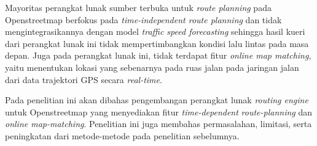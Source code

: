 Mayoritas perangkat lunak sumber terbuka untuk \textit{route planning} pada Openstreetmap berfokus pada \textit{time-independent route planning} dan tidak mengintegrasikannya dengan model \textit{traffic speed forecasting} sehingga hasil kueri dari perangkat lunak ini tidak mempertimbangkan kondisi lalu lintas pada masa depan. Juga pada perangkat lunak ini, tidak terdapat fitur \textit{online map matching}, yaitu menentukan lokasi yang sebenarnya pada ruas jalan pada jaringan jalan dari data trajektori GPS secara \textit{real-time}.

Pada penelitian ini akan dibahas pengembangan perangkat lunak \textit{routing engine} untuk Openstreetmap yang menyediakan fitur \textit{time-dependent} \textit{route-planning} dan \textit{online map-matching}. Penelitian ini juga membahas permasalahan, limitasi, serta peningkatan dari metode-metode pada penelitian sebelumnya.


